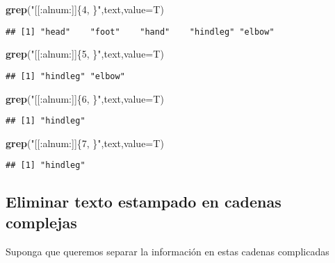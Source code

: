 \documentclass[]{article}
\newenvironment{Shaded}{\begin{snugshade}}{\end{snugshade}}
\newcommand{\KeywordTok}[1]{\textcolor[rgb]{0.13,0.29,0.53}{\textbf{#1}}}
\newcommand{\DataTypeTok}[1]{\textcolor[rgb]{0.13,0.29,0.53}{#1}}
\newcommand{\StringTok}[1]{\textcolor[rgb]{0.31,0.60,0.02}{#1}}
\newcommand{\NormalTok}[1]{#1}
\begin{document}
\begin{Shaded}
\begin{Highlighting}[]
\KeywordTok{grep}\NormalTok{(}\StringTok{"[[:alnum:]]\{4, \}"}\NormalTok{,text,}\DataTypeTok{value=}\NormalTok{T)}
\end{Highlighting}
\end{Shaded}

\begin{verbatim}
## [1] "head"    "foot"    "hand"    "hindleg" "elbow"
\end{verbatim}

\begin{Shaded}
\begin{Highlighting}[]
\KeywordTok{grep}\NormalTok{(}\StringTok{"[[:alnum:]]\{5, \}"}\NormalTok{,text,}\DataTypeTok{value=}\NormalTok{T)}
\end{Highlighting}
\end{Shaded}

\begin{verbatim}
## [1] "hindleg" "elbow"
\end{verbatim}

\begin{Shaded}
\begin{Highlighting}[]
\KeywordTok{grep}\NormalTok{(}\StringTok{"[[:alnum:]]\{6, \}"}\NormalTok{,text,}\DataTypeTok{value=}\NormalTok{T)}
\end{Highlighting}
\end{Shaded}

\begin{verbatim}
## [1] "hindleg"
\end{verbatim}

\begin{Shaded}
\begin{Highlighting}[]
\KeywordTok{grep}\NormalTok{(}\StringTok{"[[:alnum:]]\{7, \}"}\NormalTok{,text,}\DataTypeTok{value=}\NormalTok{T)}
\end{Highlighting}
\end{Shaded}

\begin{verbatim}
## [1] "hindleg"
\end{verbatim}

\subsection{Eliminar texto estampado en cadenas
complejas}\label{eliminar-texto-estampado-en-cadenas-complejas}

Suponga que queremos separar la información en estas cadenas complicadas
\end{document}
